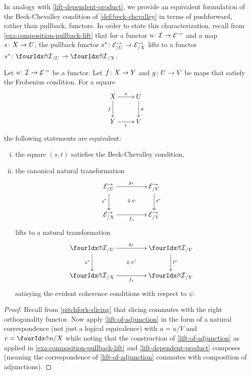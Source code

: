 \documentclass[reqno,10pt,a4paper,oneside]{amsart}
\begin{document}
In analogy with \cref{lift-dependent-product}, we provide an equivalent formulation of the Beck-Chevalley condition of \cref{def:beck-chevalley} in terms of pushforward, rather than pullback, functors.
In order to state this characterization, recall from \cref{exa:composition-pullback-lift} that for a functor $u \colon \mathcal{I} \to \mathcal{E}^\to$ and a map $s \colon X \to U$, the pullback functor $s^* \colon \mathcal{E}^\to_{/U} \to \mathcal{E}^\to_{/X}$ lifts to a functor $s^* \co {\liftr{\cal{I}}}_{/U} \to {\liftr{\cal{I}}}_{/X}$.


\begin{proposition} \label{lift-pushforward-BC}
Let $u \colon \mathcal{I} \to \mathcal{E}^\to$ be a functor.
Let $f \colon X \to Y$ and $g \colon U \to V$ be maps that satisfy the Frobenius condition.
For a square
\[
\xymatrix{
  X
  \ar[d]_{f}
  \ar[r]^{s}
&
  U
  \ar[d]^{g}
\\
  Y
  \ar[r]_{t}
&
  V
}
\]
the following statements are equivalent:
\begin{enumerate}[(i)]
\item the square $(s,t)$ satisfies the Beck-Chevalley condition,
\item the canonical natural transformation
\[
\xymatrix@C+2em{
  \cal{E}^\to_{/U}
  \ar[r]^{g_*}
   \ar[d]_{s^*}
  \ar@{}[dr]|{\Downarrow \, \psi}
&
\cal{E}^\to_{/V}
 \ar[d]^{t^*}
\\
  \cal{E}^\to_{/X}
  \ar[r]_{f_*}
&
  \cal{E}^\to_{/Y}
}
\]
lifts to a natural transformation
\[
\xymatrix@C+2em{
  {\liftr{\cal{I}}}_{/U}
  \ar[r]^{g_*}
  \ar[d]_{s^*}
  \ar@{}[dr]|{\Downarrow \, \psi'}
&
  {\liftr{\cal{I}}}_{/V}
  \ar[d]^{t^*}
\\
  {\liftr{\cal{I}}}_{/X}
  \ar[r]_{f_*}
&
  {\liftr{\cal{I}}}_{/Y}
}
\]
satisying the evident coherence conditions with respect to $\psi$.
\end{enumerate}
\end{proposition}

\begin{proof}
Recall from \cref{pitchfork-slicing} that slicing commutes with the right orthogonality functor.
Now apply \cref{lift-of-adjunction} in the form of a natural correspondence (not just a logical equivalence) with $u = u/V$ and $v = \liftr{u}/X$ while noting that the construction of \cref{lift-of-adjunction} as applied in \cref{exa:composition-pullback-lift} and \cref{lift-dependent-product} composes (meaning the correspondence of \cref{lift-of-adjunction} commutes with composition of adjunctions).
\end{proof}
\end{document}
